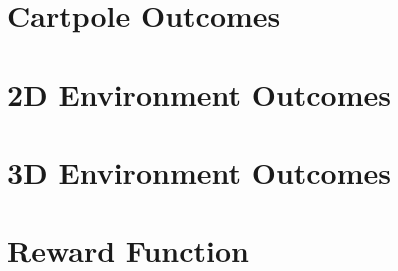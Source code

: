 \section{Cartpole Outcomes}

\section{2D Environment Outcomes}

\section{3D Environment Outcomes}

\section{Reward Function}

